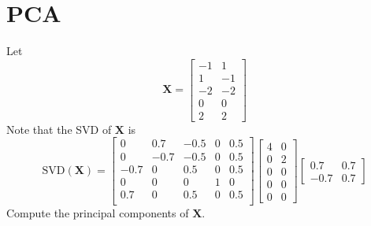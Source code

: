 \documentclass{article}
\begin{document}
\section{PCA}
Let $$\mathbf{X} = \begin{bmatrix} -1 & 1 \\ 1 & -1 \\ -2 & -2 \\ 0 & 0 \\ 2 & 2 \end{bmatrix}$$ Note that the SVD of $\mathbf{X}$ is $$\text{SVD}(\mathbf{X}) = \begin{bmatrix} 0 & 0.7 & -0.5 & 0 & 0.5 \\ 0 & -0.7 & -0.5 & 0 & 0.5 \\ -0.7 & 0 & 0.5 & 0 & 0.5 \\ 0 & 0 & 0 & 1 & 0 \\ 0.7 & 0 & 0.5 & 0 & 0.5 \\ \end{bmatrix}\begin{bmatrix} 4 & 0 \\ 0 & 2 \\ 0 & 0 \\ 0 & 0 \\ 0 & 0 \end{bmatrix}\begin{bmatrix}0.7 & 0.7 \\ -0.7 & 0.7 \end{bmatrix}$$ Compute the principal components of $\mathbf{X}$.
\end{document}
